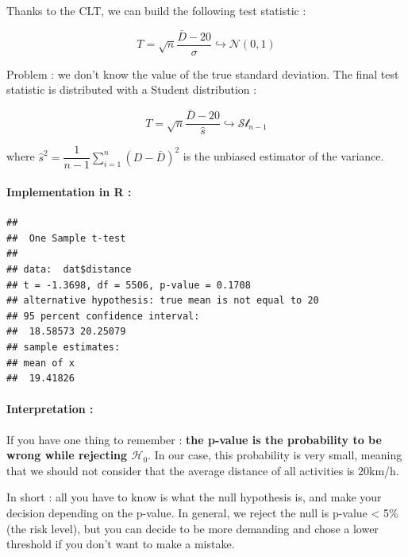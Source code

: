 \documentclass[
]{book}
\newenvironment{Shaded}{\begin{snugshade}}{\end{snugshade}}
\newcommand{\DataTypeTok}[1]{\textcolor[rgb]{0.13,0.29,0.53}{#1}}
\newcommand{\DecValTok}[1]{\textcolor[rgb]{0.00,0.00,0.81}{#1}}
\newcommand{\KeywordTok}[1]{\textcolor[rgb]{0.13,0.29,0.53}{\textbf{#1}}}
\newcommand{\NormalTok}[1]{#1}
\newcommand{\OperatorTok}[1]{\textcolor[rgb]{0.81,0.36,0.00}{\textbf{#1}}}
\begin{document}
Thanks to the CLT, we can build the following test statistic :

\[T = \sqrt{n} \dfrac{\bar{D}-20}{\sigma} \hookrightarrow \mathcal{N}(0,1)\]

Problem : we don't know the value of the true standard deviation. The final test statistic is distributed with a Student distribution :

\[T = \sqrt{n} \dfrac{\bar{D}-20}{\hat{s}} \hookrightarrow \mathcal{St}_{n-1}\]

where \(\hat{s}^2 = \dfrac{1}{n-1}\sum_{i=1}^n (D-\bar{D})^2\) is the unbiased estimator of the variance.

\hypertarget{implementation-in-r}{%
\paragraph{Implementation in R :}\label{implementation-in-r}}

\begin{Shaded}
\end{Shaded}

\begin{verbatim}
## 
## 	One Sample t-test
## 
## data:  dat$distance
## t = -1.3698, df = 5506, p-value = 0.1708
## alternative hypothesis: true mean is not equal to 20
## 95 percent confidence interval:
##  18.58573 20.25079
## sample estimates:
## mean of x 
##  19.41826
\end{verbatim}

\hypertarget{interpretation}{%
\paragraph{Interpretation :}\label{interpretation}}

If you have one thing to remember : \textbf{the p-value is the probability to be wrong while rejecting \(\mathcal{H_0}\)}.
In our case, this probability is very small, meaning that we should not consider that the average distance of all activities is 20km/h.

In short : all you have to know is what the null hypothesis is, and make your decision depending on the p-value. In general, we reject the null is p-value \textless{} 5\% (the risk level), but you can decide to be more demanding and chose a lower threshold if you don't want to make a mistake.
\end{document}
